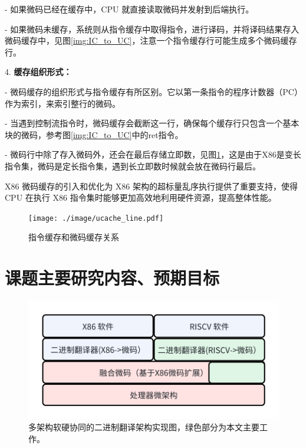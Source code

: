 \documentclass{Style/ucasproposal}%
\begin{document}
- 如果微码已经在缓存中，CPU 就直接读取微码并发射到后端执行。

- 如果微码未缓存，系统则从指令缓存中取得指令，进行译码，并将译码结果存入微码缓存中，见图\ref{img:IC_to_UC}，注意一个指令缓存行可能生成多个微码缓存行。

4. \textbf{缓存组织形式：}

- 微码缓存的组织形式与指令缓存有所区别。它以第一条指令的程序计数器（PC）作为索引，来索引整行的微码。

- 当遇到控制流指令时，微码缓存会截断这一行，确保每个缓存行只包含一个基本块的微码，参考图\ref{img:IC_to_UC}中的ret指令。

- 微码行中除了存入微码外，还会在最后存储立即数，见图\ref{img:ucache_line}，这是由于X86是变长指令集，微码是定长指令集，遇到长立即数时候就会放在微码行最后。

X86 微码缓存的引入和优化为 X86 架构的超标量乱序执行提供了重要支持，使得 CPU 在执行 X86 指令集时能够更加高效地利用硬件资源，提高整体性能。

\begin{figure}[h]
  \centering
  \texttt{[image: ./image/ucache\_line.pdf]}
  \caption{指令缓存和微码缓存关系}
  \label{img:ucache_line}
\end{figure}


\section{课题主要研究内容、预期目标}


\begin{figure}[h]
  \centering
  \includegraphics[width=0.8\linewidth]{./feishuImage/implement_arch.png}
  \caption{多架构软硬协同的二进制翻译架构实现图，绿色部分为本文主要工作。}
  \label{img:implement_arch}
\end{figure}
\end{document}
